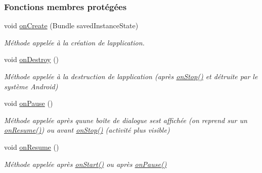 \subsubsection*{Fonctions membres protégées}
\begin{DoxyCompactItemize}
\item 
void \hyperlink{classcom_1_1example_1_1bee__honeyt_1_1_i_h_m_mobile_af487b0250bfc0e873fe3a4f495c3ef5e}{on\+Create} (Bundle saved\+Instance\+State)
\begin{DoxyCompactList}\small\item\em Méthode appelée à la création de l\textquotesingle{}application. \end{DoxyCompactList}\item 
void \hyperlink{classcom_1_1example_1_1bee__honeyt_1_1_i_h_m_mobile_a35ee33d6497d0ed0a5acacefaebce63a}{on\+Destroy} ()
\begin{DoxyCompactList}\small\item\em Méthode appelée à la destruction de l\textquotesingle{}application (après \hyperlink{classcom_1_1example_1_1bee__honeyt_1_1_i_h_m_mobile_ad341d4dd8d326f2ecdca7a5447c3f8a4}{on\+Stop()} et détruite par le système Android) \end{DoxyCompactList}\item 
void \hyperlink{classcom_1_1example_1_1bee__honeyt_1_1_i_h_m_mobile_a8b2f247beaf4e5f146c579b38d8bdee9}{on\+Pause} ()
\begin{DoxyCompactList}\small\item\em Méthode appelée après qu\textquotesingle{}une boîte de dialogue s\textquotesingle{}est affichée (on reprend sur un \hyperlink{classcom_1_1example_1_1bee__honeyt_1_1_i_h_m_mobile_aa8e9489786f095aee58ae5895b118ef6}{on\+Resume()}) ou avant \hyperlink{classcom_1_1example_1_1bee__honeyt_1_1_i_h_m_mobile_ad341d4dd8d326f2ecdca7a5447c3f8a4}{on\+Stop()} (activité plus visible) \end{DoxyCompactList}\item 
void \hyperlink{classcom_1_1example_1_1bee__honeyt_1_1_i_h_m_mobile_aa8e9489786f095aee58ae5895b118ef6}{on\+Resume} ()
\begin{DoxyCompactList}\small\item\em Méthode appelée après \hyperlink{classcom_1_1example_1_1bee__honeyt_1_1_i_h_m_mobile_abab25414f97d4793152b39c2deb8365b}{on\+Start()} ou après \hyperlink{classcom_1_1example_1_1bee__honeyt_1_1_i_h_m_mobile_a8b2f247beaf4e5f146c579b38d8bdee9}{on\+Pause()} \end{DoxyCompactList}\item 

\end{DoxyCompactItemize}
